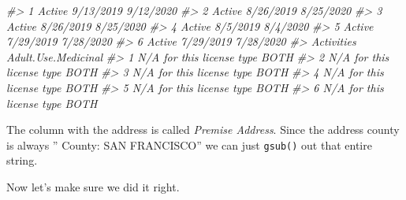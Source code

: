 \documentclass[
]{krantz}
\makeatletter
\newenvironment{Shaded}{\begin{snugshade}}{\end{snugshade}}
\newcommand{\CommentTok}[1]{\textcolor[rgb]{0.37,0.37,0.37}{\textit{#1}}}
\newcommand{\FunctionTok}[1]{\textcolor[rgb]{0,0,0}{#1}}
\newcommand{\NormalTok}[1]{#1}
\newcommand{\OtherTok}[1]{\textcolor[rgb]{0.37,0.37,0.37}{#1}}
\newcommand{\SpecialCharTok}[1]{\textcolor[rgb]{0,0,0}{#1}}
\newcommand{\StringTok}[1]{\textcolor[rgb]{0.5,0.5,0.5}{#1}}
\newenvironment{kframe}{%
\medskip{}
\setlength{\fboxsep}{.8em}
 \def\at@end@of@kframe{}%
 \ifinner\ifhmode%
  \def\at@end@of@kframe{\end{minipage}}%
  \begin{minipage}{\columnwidth}%
 \fi\fi%
 \def\FrameCommand##1{\hskip\@totalleftmargin \hskip-\fboxsep
 \colorbox{shadecolor}{##1}\hskip-\fboxsep
     \hskip-\linewidth \hskip-\@totalleftmargin \hskip\columnwidth}%
 \MakeFramed {\advance\hsize-\width
   \@totalleftmargin\z@ \linewidth\hsize
   \@setminipage}}%
 {\par\unskip\endMakeFramed%
 \at@end@of@kframe}
\renewenvironment{Shaded}{\begin{kframe}}{\end{kframe}}
\makeatother
\begin{document}
\begin{Shaded}
\begin{Highlighting}[]
\CommentTok{\#\textgreater{} 1 Active  9/13/2019       9/12/2020}
\CommentTok{\#\textgreater{} 2 Active  8/26/2019       8/25/2020}
\CommentTok{\#\textgreater{} 3 Active  8/26/2019       8/25/2020}
\CommentTok{\#\textgreater{} 4 Active   8/5/2019        8/4/2020}
\CommentTok{\#\textgreater{} 5 Active  7/29/2019       7/28/2020}
\CommentTok{\#\textgreater{} 6 Active  7/29/2019       7/28/2020}
\CommentTok{\#\textgreater{}                  Activities Adult.Use.Medicinal}
\CommentTok{\#\textgreater{} 1 N/A for this license type                BOTH}
\CommentTok{\#\textgreater{} 2 N/A for this license type                BOTH}
\CommentTok{\#\textgreater{} 3 N/A for this license type                BOTH}
\CommentTok{\#\textgreater{} 4 N/A for this license type                BOTH}
\CommentTok{\#\textgreater{} 5 N/A for this license type                BOTH}
\CommentTok{\#\textgreater{} 6 N/A for this license type                BOTH}
\end{Highlighting}
\end{Shaded}

The column with the address is called \emph{Premise
Address}. Since the address county is always '' County: SAN
FRANCISCO'' we can just \texttt{gsub()} out that entire
string.

\begin{Shaded}
\end{Shaded}

Now let's make sure we did it right.

\begin{Shaded}
\end{Shaded}
\end{document}
